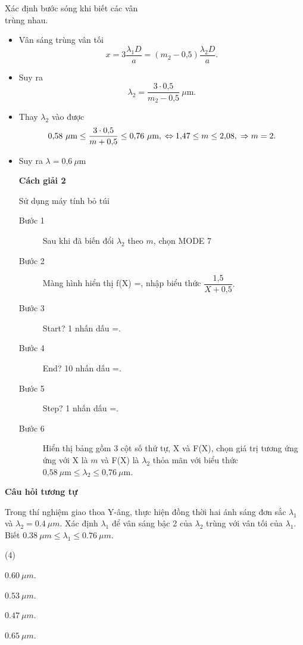 \begin{dang}{Xác định bước sóng khi biết các vân\\ trùng nhau.}
{		\begin{itemize}
			\item Vân sáng trùng vân tối 
			\begin{equation*}
				x=3\dfrac{\lambda_1 D}{a}=(m_2 - \text{0,5})\dfrac{\lambda_2 D}{a}.
			\end{equation*}
			\item Suy ra 
			\begin{equation*}
				\lambda_2= \dfrac{3\cdot \text{0,5}}{m_2-\text{0,5}}\ \mu \text{m}. 
			\end{equation*}
			\item Thay $\lambda_2$ vào được 
			\begin{equation*}
				\text{0,58}\ \mu \text{m} \leq \dfrac{3\cdot \text{0,5}}{m+\text{0,5}} \leq \text{0,76}\ \mu \text{m},\\
				\Leftrightarrow \text{1,47} \leq m \leq \text{2,08}, \\
				\Rightarrow m =2.
			\end{equation*}
			
			\item Suy ra $\lambda = \text{0,6}\ \mu \text{m}$
			
			\textbf{Cách giải 2}
			
			Sử dụng máy tính bỏ túi 
			
			\begin{description}
				\item [Bước 1] Sau khi đã biến đổi $\lambda_2$ theo $m$, chọn MODE 7
				\item [Bước 2] Màng hình hiển thị f(X) =, nhập biểu thức $\dfrac{\text{1,5}}{X+\text{0,5}}.$
				\item [Bước 3] Start? 1  nhấn dấu =.
				\item [Bước 4] End? 10 nhấn dấu =.
				\item [Bước 5]Step? 1 nhấn dấu =.
				\item [Bước 6] Hiển thị bảng gồm 3 cột số thứ tự, X và F(X), chọn giá trị tương ứng ứng với X là $m$ và F(X) là $\lambda_2$ thỏa mãn với biểu thức $\text{0,58}\ \mu \text{m} \leq \lambda_2 \leq \text{0,76}\ \mu \text{m}$.
			\end{description}
			
		\end{itemize}
		
		\begin{center}
			\textbf{Câu hỏi tương tự}
		\end{center}
		
		Trong thí nghiệm giao thoa Y-âng, thực hiện đồng thời hai ánh sáng đơn sắc $ \lambda_{1} $ và $ \lambda_{2} = \SI{0,4}{\mu m} $. Xác định $ \lambda_{1} $ để vân sáng bậc 2 của $ \lambda_{2} $ trùng với vân tối của $ \lambda_{1} $. Biết $ \SI{0,38}{\mu m} \leq \lambda_{1} \leq \SI{0,76}{\mu m} $.
		\begin{mcq}(4)
			\item $ \SI{0,60}{\mu m} $.
			\item $ \SI{0,53}{\mu m} $.
			\item $ \SI{0,47}{\mu m} $.
			\item $ \SI{0,65}{\mu m} $.
		\end{mcq}
		
}
\end{dang}
